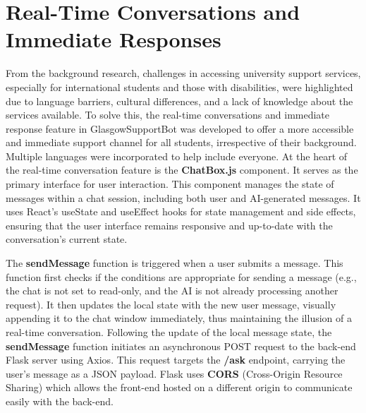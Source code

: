 \documentclass{l4proj}
\begin{document}
\section{Real-Time Conversations and Immediate Responses}

From the background research, challenges in accessing university support services, especially for international students and those with disabilities, were highlighted due to language barriers, cultural differences, and a lack of knowledge about the services available. To solve this, the real-time conversations and immediate response feature in GlasgowSupportBot was developed to offer a more accessible and immediate support channel for all students, irrespective of their background. Multiple languages were incorporated to help include everyone.
At the heart of the real-time conversation feature is the \textbf{ChatBox.js} component. It serves as the primary interface for user interaction. This component manages the state of messages within a chat session, including both user and AI-generated messages. It uses React's useState and useEffect hooks for state management and side effects, ensuring that the user interface remains responsive and up-to-date with the conversation's current state.

The \textbf{sendMessage} function is triggered when a user submits a message. This function first checks if the conditions are appropriate for sending a message (e.g., the chat is not set to read-only, and the AI is not already processing another request). It then updates the local state with the new user message, visually appending it to the chat window immediately, thus maintaining the illusion of a real-time conversation. Following the update of the local message state, the \textbf{sendMessage} function initiates an asynchronous POST request to the back-end Flask server using Axios. This request targets the \textbf{/ask} endpoint, carrying the user's message as a JSON payload. Flask uses \textbf{CORS} (Cross-Origin Resource Sharing) which allows the front-end hosted on a different origin to communicate easily with the back-end.
\end{document}
